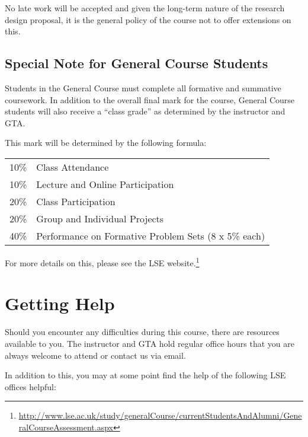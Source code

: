 \documentclass[12pt,a4paper]{article}
\begin{document}
No late work will be accepted and given the long-term nature of the research design proposal, it is the general policy of the course not to offer extensions on this.

\subsection{Special Note for General Course Students}

Students in the General Course must complete all formative and summative coursework. In addition to the overall final mark for the course, General Course students will also receive a ``class grade'' as determined by the instructor and GTA. 

This mark will be determined by the following formula:

\begin{center}
\begin{tabular}{rl}
10\% & Class Attendance \\
10\% & Lecture and Online Participation \\
20\% & Class Participation \\
20\% & Group and Individual Projects \\
40\% & Performance on Formative Problem Sets (8 x 5\% each) \\
\end{tabular}
\end{center}

For more details on this, please see the LSE website.\footnote{\url{http://www.lse.ac.uk/study/generalCourse/currentStudentsAndAlumni/GeneralCourseAssessment.aspx}}


\section{Getting Help}

Should you encounter any difficulties during this course, there are resources available to you. The instructor and GTA hold regular office hours that you are always welcome to attend or contact us via email.

In addition to this, you may at some point find the help of the following LSE offices helpful:
\end{document}
